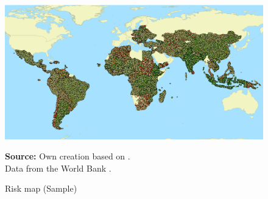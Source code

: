 \begin{figure}[H]
\begin{center}
\caption{Risk map (Sample)}
\label{fig_risk_map}
\includegraphics[width=\textwidth,height=1\textheight,keepaspectratio]{../img/risk_map.pdf}
\end{center}
\noindent \footnotesize{\textbf{Source:} Own creation based on \cite{wb_i_map}. \\Data from the World Bank \parencite{wb_data}.}
\end{figure}


